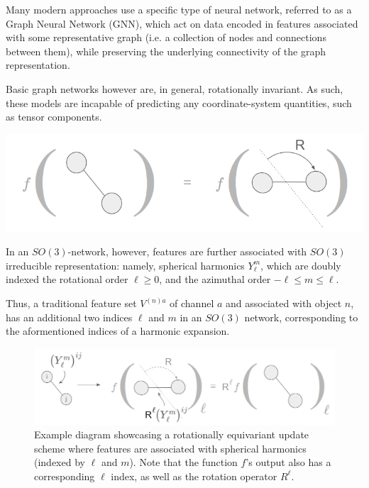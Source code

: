 \documentclass[10pt,a4paper]{article}
\begin{document}
Many modern approaches use a specific type of neural network, referred to as a Graph Neural Network (GNN), which act on data encoded in features associated with some representative graph (i.e. a collection of nodes and connections between them), while preserving the underlying connectivity of the graph representation.

Basic graph networks however are, in general, rotationally invariant. As such, these models are incapable of predicting any coordinate-system quantities, such as tensor components. 
\begin{center}
\includegraphics[scale=0.8]{invariant.png}
\end{center}
In an $SO(3)$-network, however, features are further associated with $SO(3)$ irreducible representation: namely, spherical harmonics $Y_{\ell}^m$, which are doubly indexed the rotational order $\ell\geq 0$, and the azimuthal order $-\ell\leq m \leq \ell$.

Thus, a traditional feature set $V^{(n)a}$ of channel $a$ and associated with object $n$, has an additional two indices $\ell$ and $m$ in an $SO(3)$ network, corresponding to the aformentioned indices of a harmonic expansion.

\begin{figure}
\begin{center}
\includegraphics[scale=0.8]{equivariant.png}
\end{center}
\caption{Example diagram showcasing a rotationally equivariant update scheme where features are associated with spherical harmonics (indexed by $\ell$ and $m$). Note that the function $f$'s output also has a corresponding $\ell$ index, as well as the rotation operator $R^{\ell}$.}
\end{figure}
\end{document}
